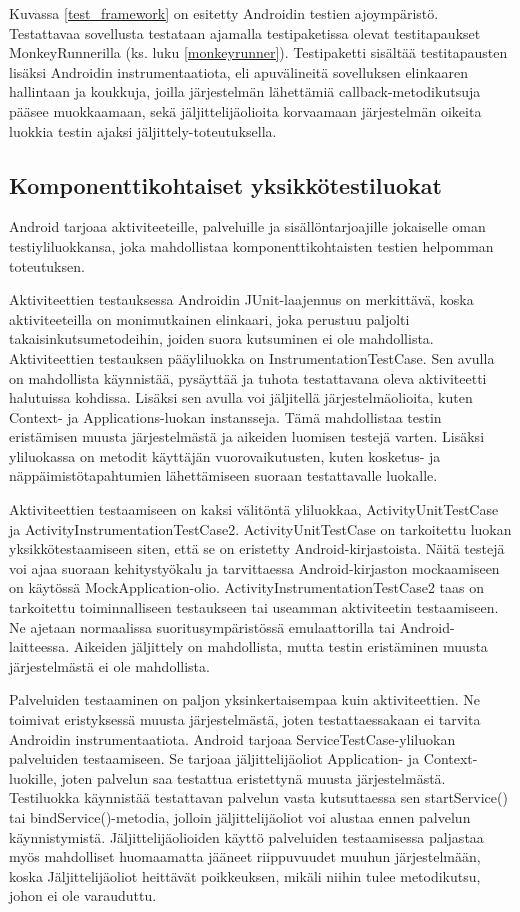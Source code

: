 Kuvassa \ref{test_framework} on esitetty Androidin testien ajoympäristö. Testattavaa sovellusta testataan ajamalla testipaketissa olevat testitapaukset MonkeyRunnerilla (ks. luku \ref{monkeyrunner}). Testipaketti sisältää testitapausten lisäksi Androidin instrumentaatiota, eli apuvälineitä sovelluksen elinkaaren hallintaan ja koukkuja, joilla järjestelmän lähettämiä callback-metodikutsuja pääsee muokkaamaan, sekä jäljittelijäolioita korvaamaan järjestelmän oikeita luokkia testin ajaksi jäljittely-toteutuksella. \cite{android}

\subsection{Komponenttikohtaiset yksikkötestiluokat}

Android tarjoaa aktiviteeteille, palveluille ja sisällöntarjoajille jokaiselle oman testiyliluokkansa, joka mahdollistaa komponenttikohtaisten testien helpomman toteutuksen.

Aktiviteettien testauksessa Androidin JUnit-laajennus on merkittävä, koska aktiviteeteilla on monimutkainen elinkaari, joka perustuu paljolti takaisinkutsumetodeihin, joiden suora kutsuminen ei ole mahdollista. Aktiviteettien testauksen pääyliluokka on InstrumentationTestCase. Sen avulla on mahdollista käynnistää, pysäyttää ja tuhota testattavana oleva aktiviteetti halutuissa kohdissa. Lisäksi sen avulla voi jäljitellä järjestelmäolioita, kuten Context- ja Applications-luokan instansseja. Tämä mahdollistaa testin eristämisen muusta järjestelmästä ja aikeiden luomisen testejä varten. Lisäksi yliluokassa on metodit käyttäjän vuorovaikutusten, kuten kosketus- ja näppäimistötapahtumien lähettämiseen suoraan testattavalle luokalle.

Aktiviteettien testaamiseen on kaksi välitöntä yliluokkaa, ActivityUnitTestCase ja ActivityInstrumentationTestCase2. ActivityUnitTestCase on tarkoitettu luokan yksikkötestaamiseen siten, että se on eristetty Android-kirjastoista. Näitä testejä voi ajaa suoraan kehitystyökalu ja tarvittaessa Android-kirjaston mockaamiseen on käytössä MockApplication-olio. ActivityInstrumentationTestCase2 taas on tarkoitettu toiminnalliseen testaukseen tai useamman aktiviteetin testaamiseen. Ne ajetaan normaalissa suoritusympäristössä emulaattorilla tai Android-laitteessa. Aikeiden jäljittely on mahdollista, mutta testin eristäminen muusta järjestelmästä ei ole mahdollista.

Palveluiden testaaminen on paljon yksinkertaisempaa kuin aktiviteettien. Ne toimivat eristyksessä muusta järjestelmästä, joten testattaessakaan ei tarvita Androidin instrumentaatiota. Android tarjoaa ServiceTestCase-yliluokan palveluiden testaamiseen. Se tarjoaa jäljittelijäoliot Application- ja Context-luokille, joten palvelun saa testattua eristettynä muusta järjestelmästä. Testiluokka käynnistää testattavan palvelun vasta kutsuttaessa sen startService() tai bindService()-metodia, jolloin jäljittelijäoliot voi alustaa ennen palvelun käynnistymistä. Jäljittelijäolioiden käyttö palveluiden testaamisessa paljastaa myös mahdolliset huomaamatta jääneet riippuvuudet muuhun järjestelmään, koska Jäljittelijäoliot heittävät poikkeuksen, mikäli niihin tulee metodikutsu, johon ei ole varauduttu.

